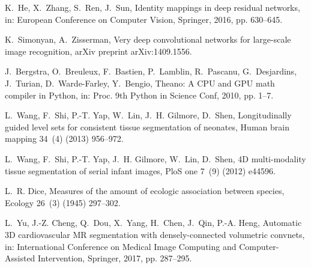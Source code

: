 \documentclass[twoside,espcrc2]{elsarticle}
\begin{document}
\begin{thebibliography}{10}
K.~He, X.~Zhang, S.~Ren, J.~Sun, Identity mappings in deep residual networks,
  in: European Conference on Computer Vision, Springer, 2016, pp. 630--645.

K.~Simonyan, A.~Zisserman, Very deep convolutional networks for large-scale
  image recognition, arXiv preprint arXiv:1409.1556.

J.~Bergstra, O.~Breuleux, F.~Bastien, P.~Lamblin, R.~Pascanu, G.~Desjardins,
  J.~Turian, D.~Warde-Farley, Y.~Bengio, Theano: {A} {CPU} and {GPU} math
  compiler in {P}ython, in: Proc. 9th Python in Science Conf, 2010, pp. 1--7.

L.~Wang, F.~Shi, P.-T. Yap, W.~Lin, J.~H. Gilmore, D.~Shen, Longitudinally
  guided level sets for consistent tissue segmentation of neonates, Human brain
  mapping 34~(4) (2013) 956--972.

L.~Wang, F.~Shi, P.-T. Yap, J.~H. Gilmore, W.~Lin, D.~Shen, {4D} multi-modality
  tissue segmentation of serial infant images, PloS one 7~(9) (2012) e44596.

L.~R. Dice, Measures of the amount of ecologic association between species,
  Ecology 26~(3) (1945) 297--302.

L.~Yu, J.-Z. Cheng, Q.~Dou, X.~Yang, H.~Chen, J.~Qin, P.-A. Heng, Automatic {3D}
  cardiovascular {MR} segmentation with densely-connected volumetric convnets,
  in: International Conference on Medical Image Computing and Computer-Assisted
  Intervention, Springer, 2017, pp. 287--295.
  
\end{thebibliography}
  
\end{document}
